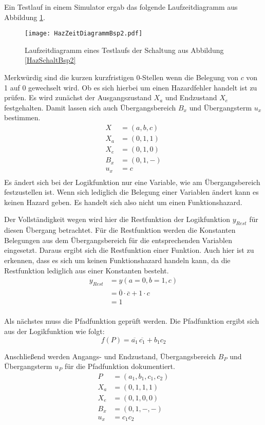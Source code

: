 Ein Testlauf in einem Simulator ergab das folgende Laufzeitdiagramm aus Abbildung \ref{HazZeitDiagBsp2}.
\begin{figure}[htp]
	\centering
	\texttt{[image: HazZeitDiagrammBsp2.pdf]}
	\caption{Laufzeitdiagramm eines Testlaufs der Schaltung aus Abbildung \ref{HazSchaltBsp2}}
	\label{HazZeitDiagBsp2}
\end{figure} 

Merkwürdig sind die kurzen kurzfristigen 0-Stellen wenn die Belegung von $c$ von 1 auf 0 gewechselt wird. Ob es sich hierbei um einen Hazardfehler handelt ist zu prüfen. Es wird zunächst der Ausgangszustand $X_a$ und Endzustand $X_e$ festgehalten. Damit lassen sich auch Übergangsbereich $B_x$ und Übergangsterm $u_x$ bestimmen.
\begin{align*}
X   &= (a,b,c) \\
X_a &= (0,1,1) \\
X_e &= (0,1,0) \\
B_x &= (0,1,-) \\
u_x &= c \\
\end{align*}
Es ändert sich bei der Logikfunktion nur eine Variable, wie am Übergangsbereich festzustellen ist. Wenn sich lediglich die Belegung einer Variablen ändert kann es keinen Hazard geben. Es handelt sich also nicht um einen Funktionshazard.

Der Vollständigkeit wegen wird hier die Restfunktion der Logikfunktion $y_{Rest}$ für diesen Übergang betrachtet. Für die Restfunktion werden die Konstanten Belegungen aus dem Übergangsbereich für die entsprechenden Variablen eingesetzt. Daraus ergibt sich die Restfunktion einer Funktion. Auch hier ist zu erkennen, dass es sich um keinen Funktionshazard handeln kann, da die Restfunktion lediglich aus einer Konstanten besteht.
\begin{align*}
y_{Rest} &= y(a=0,b=1,c) \\ 
         &= \overline{0} \cdot \overline{c} + 1 \cdot c \\ 
         &= 1 \\
\end{align*}

Als nächstes muss die Pfadfunktion geprüft werden. Die Pfadfunktion ergibt sich aus der Logikfunktion wie folgt:
$$f(P) = \overline{a_1}\hspace{2pt}\overline{c_1}  + b_1c_2$$

Anschließend werden Angangs- und Endzustand, Übergangsbereich $B_P$ und Übergangsterm $u_P$ für die Pfadfunktion dokumentiert.
\begin{align*}
P   &= (a_1,b_1,c_1, c_2) \\
X_a &= (0,1,1,1) \\
X_e &= (0,1,0,0) \\
B_x &= (0,1,-,-) \\
u_x &= c_1c_2 \\
\end{align*}


